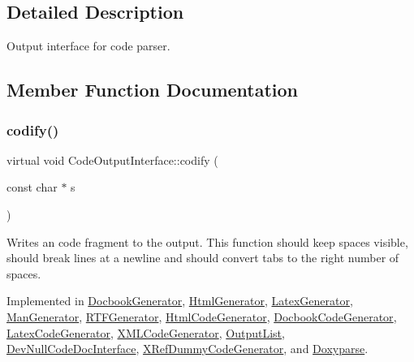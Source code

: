 \subsection{Detailed Description}
Output interface for code parser. 

\subsection{Member Function Documentation}
\mbox{\label{class_code_output_interface_aa29a5eedda08596ace50ed5b59c8ae7f}} 
\subsubsection{\texorpdfstring{codify()}{codify()}}
{\footnotesize\ttfamily virtual void Code\+Output\+Interface\+::codify (\begin{DoxyParamCaption}\item[{const char $\ast$}]{s }\end{DoxyParamCaption})\hspace{0.3cm}{\ttfamily [pure virtual]}}

Writes an code fragment to the output. This function should keep spaces visible, should break lines at a newline and should convert tabs to the right number of spaces. 

Implemented in \mbox{\hyperlink{class_docbook_generator_a9e4ccf3b4bf296deabf156225e2d02a1}{Docbook\+Generator}}, \mbox{\hyperlink{class_html_generator_a574ab87e7aa9b92c11248027912851bc}{Html\+Generator}}, \mbox{\hyperlink{class_latex_generator_a0013e3c0a103883ba879974c92b5a989}{Latex\+Generator}}, \mbox{\hyperlink{class_man_generator_a6e70bf6444a4e6d5db43f5bbb7b6b125}{Man\+Generator}}, \mbox{\hyperlink{class_r_t_f_generator_a331ca74e622c48bbbcad7e02139a6bfb}{R\+T\+F\+Generator}}, \mbox{\hyperlink{class_html_code_generator_aa482ae62b65a2fd1cc6cda022e88c920}{Html\+Code\+Generator}}, \mbox{\hyperlink{class_docbook_code_generator_a7c2c177e3e6e0485e9806a75b45bd7a3}{Docbook\+Code\+Generator}}, \mbox{\hyperlink{class_latex_code_generator_a1df8a10f2ab2ef1387d5030e4abd97bb}{Latex\+Code\+Generator}}, \mbox{\hyperlink{class_x_m_l_code_generator_a40ff443bfb15f9f862f8bd3ceb50ce89}{X\+M\+L\+Code\+Generator}}, \mbox{\hyperlink{class_output_list_a81c7d3f51fa62b85c2699830f7170ccd}{Output\+List}}, \mbox{\hyperlink{class_dev_null_code_doc_interface_a75e60fd56c45e70af39b3b926e76d53f}{Dev\+Null\+Code\+Doc\+Interface}}, \mbox{\hyperlink{class_x_ref_dummy_code_generator_a81331d5775ec9ff49ef03ebc8c0a0dae}{X\+Ref\+Dummy\+Code\+Generator}}, and \mbox{\hyperlink{class_doxyparse_aefb4447f5ddd4f26acee9c076f826635}{Doxyparse}}.


